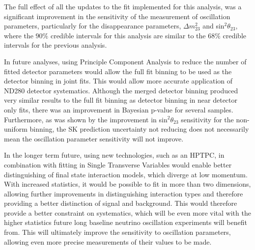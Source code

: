 The full effect of all the updates to the fit implemented for this analysis, was a significant improvement in the sensitivity of the measurement of oscillation parameters, particularly for the disappearance parameters, $\Delta m^{2}_{23}$ and sin$^2 \theta_{23}$, where the $90\%$ credible intervals for this analysis are similar to the $68\%$ credible intervals for the previous analysis.

In future analyses, using Principle Component Analysis to reduce the number of fitted detector parameters would allow the full fit binning to be used as the detector binning in joint fits. This would allow more accurate application of ND280 detector systematics. Although the merged detector binning produced very similar results to the full fit binning as detector binning in near detector only fits, there was an improvement in Bayesian p-value for several samples. Furthermore, as was shown by the improvement in sin$^2\theta_{23}$ sensitivity for the non-uniform binning, the SK prediction uncertainty not reducing does not necessarily mean the oscillation parameter sensitivity will not improve.

In the longer term future, using new technologies, such as an HPTPC, in combination with fitting in Single Transverse Variables would enable better distinguishing of final state interaction models, which diverge at low momentum. With increased statistics, it would be possible to fit in more than two dimensions, allowing further improvements in distinguishing interaction types and therefore providing a better distinction of signal and background. This would therefore provide a better constraint on systematics, which will be even more vital with the higher statistics future long baseline neutrino oscillation experiments will benefit from. This will ultimately improve the sensitivity to oscillation parameters, allowing even more precise measurements of their values to be made. 

\newpage